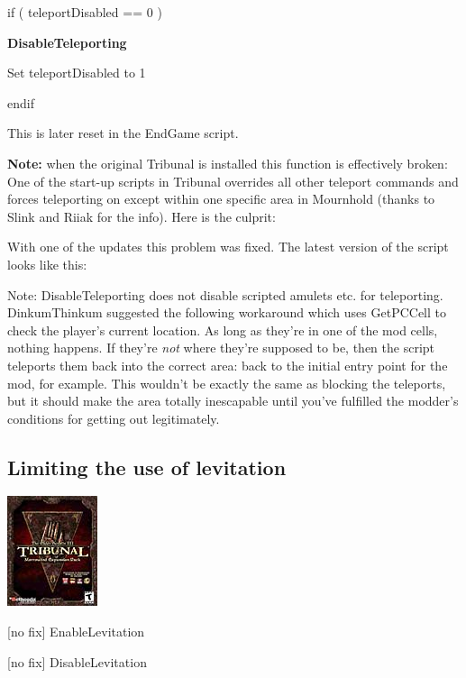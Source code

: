 if ( teleportDisabled == 0 )

\textbf{DisableTeleporting}

Set teleportDisabled to 1

endif

This is later reset in the EndGame script.

\textbf{Note:} when the original Tribunal is installed this function is
effectively broken: One of the start-up scripts in Tribunal overrides
all other teleport commands and forces teleporting on except within one
specific area in Mournhold (thanks to Slink and Riiak for the info).
Here is the culprit:



With one of the updates this problem was fixed. The latest version of
the script looks like this:



Note: DisableTeleporting does not disable scripted amulets etc. for
teleporting. DinkumThinkum suggested the following workaround which uses
GetPCCell to check the player's current location. As long as they're in
one of the mod cells, nothing happens. If they're \emph{not} where
they're supposed to be, then the script teleports them back into the
correct area: back to the initial entry point for the mod, for example.
This wouldn't be exactly the same as blocking the teleports, but it
should make the area totally inescapable until you've fulfilled the
modder's conditions for getting out legitimately.



\hypertarget{limiting-the-use-of-levitation}{%
\subsection{Limiting the use of
levitation}\label{limiting-the-use-of-levitation}}

\includegraphics{media/image6.png}

{[}no fix{]} EnableLevitation

{[}no fix{]} DisableLevitation

